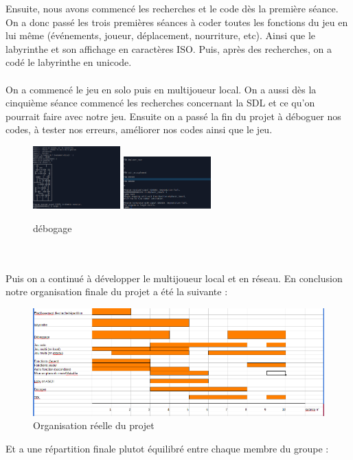 \documentclass[12pt,a4paper,twoside]{article}
\begin{document}
Ensuite, nous avons commencé les recherches et le code dès la première séance.
On a donc passé les trois premières séances à coder toutes les fonctions du jeu en lui même (événements, joueur, déplacement, nourriture, etc). Ainsi que le labyrinthe et son affichage en caractères ISO.
Puis, après des recherches, on a codé le labyrinthe en unicode.
\\
\\
On a commencé le jeu en solo puis en multijoueur local. On a aussi dès la cinquième séance commencé les recherches concernant la SDL et ce qu'on pourrait faire avec notre jeu. Ensuite on a passé la fin du projet à déboguer nos codes, à tester nos erreurs, améliorer nos codes ainsi que le jeu.
\begin {figure}[h]
\includegraphics[width=0.3\textwidth]{debbeug.png}
\hspace{100pt}
\includegraphics[width=0.3\textwidth]{debug.png}
\caption{\label {ref3}débogage}
\end {figure}
\\
\\
Puis on a continué à développer le multijoueur local et en réseau.
En conclusion notre organisation finale du projet a été la suivante :
\begin {figure}[h]
\includegraphics[width=1.1\textwidth]{grantt.png}
\caption{\label {ref4}Organisation réelle du projet}
\end {figure}
Et a une répartition finale plutot équilibré entre chaque membre du groupe : \\
\end{document}
